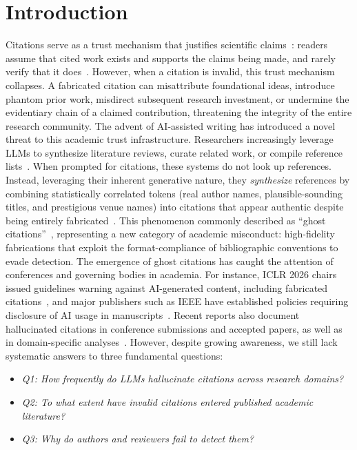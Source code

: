 \section{Introduction}

Citations serve as a trust mechanism that justifies scientific claims~\cite{kaplan1965norms}: readers assume that cited work exists and supports the claims being made, and rarely verify that it does~\cite{simkin2003read}. However, when a citation is invalid, this trust mechanism collapses.
A fabricated citation can misattribute foundational ideas, introduce phantom prior work, misdirect subsequent research investment, or undermine the evidentiary chain of a claimed contribution, threatening the integrity of the entire research community.
The advent of AI-assisted writing has introduced a novel threat to this academic trust infrastructure.
Researchers increasingly leverage LLMs to synthesize literature reviews, curate related work, or compile reference lists~\cite{mohammadi2025generative}.
When prompted for citations, these systems do not look up references. Instead, leveraging their inherent generative nature, they \textit{synthesize} references by combining statistically correlated tokens (real author names, plausible-sounding titles, and prestigious venue names) into citations that appear authentic despite being entirely fabricated~\cite{vaswani2017attention}. 
This phenomenon commonly described as ``ghost citations''~\cite{consultmu2026ghost,tay2025why}, representing a new category of academic misconduct: high-fidelity fabrications that exploit the format-compliance of bibliographic conventions to evade detection. 
The emergence of ghost citations has caught the attention of conferences and governing bodies in academia. For instance, ICLR 2026 chairs issued guidelines warning against AI-generated content, including fabricated citations~\cite{chairs2025iclr}, and major publishers such as IEEE have established policies requiring disclosure of AI usage in manuscripts~\cite{ieee2025ai-policy}.
Recent reports also document hallucinated citations in conference submissions and accepted papers, as well as in domain-specific analyses~\cite{gptzero2025nips,gptzero2026iclr,sakai2026hallucitation}.
However, despite growing awareness, we still lack systematic answers to three fundamental questions: 
\begin{itemize}
    \item \textit{Q1: How frequently do LLMs hallucinate citations across research domains?} 
    \item \textit{Q2: To what extent have invalid citations entered published academic literature?} 
    \item \textit{Q3: Why do authors and reviewers fail to detect them?} 
\end{itemize}

